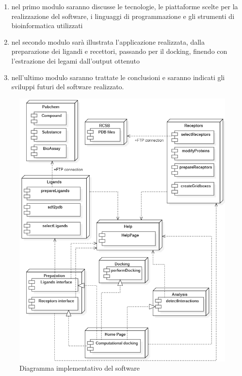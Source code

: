 \begin{enumerate}
    \item nel primo modulo saranno discusse le tecnologie, le piattaforme scelte per la realizzazione del software, i linguaggi di programmazione e gli strumenti di bioinformatica utilizzati
    \item nel secondo modulo sarà illustrata l'applicazione realizzata, dalla preparazione dei ligandi e recettori, passando per il docking, finendo con l'estrazione dei legami dall'output ottenuto
    \item nell'ultimo modulo saranno trattate le conclusioni e saranno indicati gli sviluppi futuri del software realizzato.
\end{enumerate} 

\begin{figure}[H]
    \centering
    \includegraphics[scale=0.9]{immagini/capitolo1/UML.png}
    \caption{Diagramma implementativo del software}
    \label{fig:UML}
\end{figure}